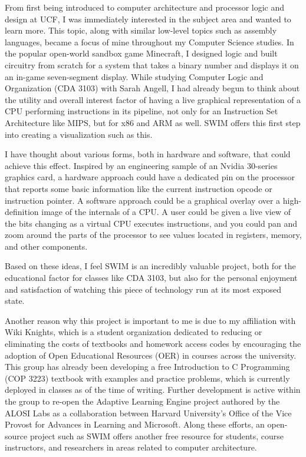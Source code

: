 \documentclass[
    paper=letter,
    parskip=half,
    fontsize=12pt,
    titlepage=firstiscover,
    toc=bibliography,
    numbers=endperiod
]{scrartcl}
\begin{document}
From first being introduced to computer architecture and processor logic
and design at UCF, I was immediately interested in the subject area and
wanted to learn more. This topic, along with similar low-level topics
such as assembly languages, became a focus of mine throughout my
Computer Science studies. In the popular open-world sandbox game
Minecraft, I designed logic and built circuitry from scratch for a
system that takes a binary number and displays it on an in-game
seven-segment display. While studying Computer Logic and Organization
(CDA 3103) with Sarah Angell, I had already begun to think about the
utility and overall interest factor of having a live graphical
representation of a CPU performing instructions in its pipeline, not
only for an Instruction Set Architecture like MIPS, but for x86 and ARM
as well. SWIM offers this first step into creating a visualization such
as this.

I have thought about various forms, both in hardware and software, that
could achieve this effect. Inspired by an engineering sample of an
Nvidia 30-series graphics card, a hardware approach could have a
dedicated pin on the processor that reports some basic information like
the current instruction opcode or instruction pointer. A software
approach could be a graphical overlay over a high-definition image of
the internals of a CPU. A user could be given a live view of the bits
changing as a virtual CPU executes instructions, and you could pan and
zoom around the parts of the processor to see values located in
registers, memory, and other components.

Based on these ideas, I feel SWIM is an incredibly valuable project,
both for the educational factor for classes like CDA 3103, but also for
the personal enjoyment and satisfaction of watching this piece of
technology run at its most exposed state.

Another reason why this project is important to me is due to my
affiliation with Wiki Knights, which is a student organization dedicated
to reducing or eliminating the costs of textbooks and homework access
codes by encouraging the adoption of Open Educational Resources (OER) in
courses across the university. This group has already been developing a
free Introduction to C Programming (COP 3223) textbook with examples and
practice problems, which is currently deployed in classes as of the time
of writing. Further development is active within the group to re-open
the Adaptive Learning Engine project authored by the ALOSI Labs as a
collaboration between Harvard University's Office of the Vice Provost
for Advances in Learning and Microsoft. Along these efforts, an
open-source project such as SWIM offers another free resource for
students, course instructors, and researchers in areas related to
computer architecture.
\end{document}
